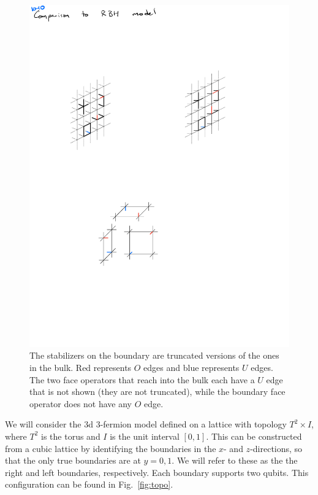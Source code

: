 \documentclass[twocolumn, longbibliography]{revtex4-2}
\begin{document}
\begin{figure}
\centering
\includegraphics[width=.6\linewidth]{bdyops}
\caption{The stabilizers on the boundary are truncated versions of the ones in the bulk. Red represents $O$ edges and blue represents $U$ edges. The two face operators that reach into the bulk each have a $U$ edge that is not shown (they are not truncated), while the boundary face operator does not have any $O$ edge.}
\label{fig:bdyops}
\end{figure}

We will consider the 3d 3-fermion model defined on a lattice with topology $T^2\times I$, where $T^2$ is the torus and $I$ is the unit interval $[0,1]$. This can be constructed from a cubic lattice by identifying the boundaries in the $x$- and $z$-directions, so that the only true boundaries are at $y=0,1$. We will refer to these as the the right and left boundaries, respectively. Each boundary supports two qubits. This configuration can be found in Fig.~\ref{fig:topo}.
\end{document}
